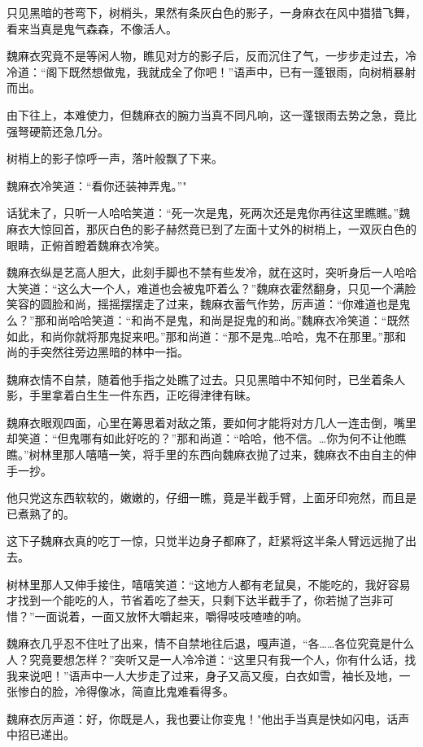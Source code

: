 \documentclass[12pt,oneside]{book}
\begin{document}
只见黑暗的苍弯下，树梢头，果然有条灰白色的影子，一身麻衣在风中猎猎飞舞，看来当真是鬼气森森，不像活人。

魏麻衣究竟不是等闲人物，瞧见对方的影子后，反而沉住了气，一步步走过去，冷冷道：``阁下既然想做鬼，我就成全了你吧！''语声中，已有一蓬银雨，向树梢暴射而出。

由下往上，本难使力，但魏麻衣的腕力当真不同凡响，这一蓬银雨去势之急，竟比强弩硬箭还急几分。

树梢上的影子惊呼一声，落叶般飘了下来。

魏麻衣冷笑道：``看你还装神弄鬼。''"

话犹未了，只听一人哈哈笑道：``死一次是鬼，死两次还是鬼你再往这里瞧瞧。''魏麻衣大惊回首，那灰白色的影子赫然竟已到了左面十丈外的树梢上，一双灰白色的眼睛，正俯首瞪着魏麻衣冷笑。

魏麻衣纵是艺高人胆大，此刻手脚也不禁有些发冷，就在这时，突听身后一人哈哈大笑道：``这么大一个人，难道也会被鬼吓着么？''魏麻衣霍然翻身，只见一个满脸笑容的圆脸和尚，摇摇摆摆走了过来，魏麻衣蓄气作势，厉声道：``你难道也是鬼么？''那和尚哈哈笑道：``和尚不是鬼，和尚是捉鬼的和尚。''魏麻衣冷笑道：``既然如此，和尚你就将那鬼捉来吧。''那和尚道：``那不是鬼\ldots 哈哈，鬼不在那里。''那和尚的手突然往旁边黑暗的林中一指。

魏麻衣情不自禁，随着他手指之处瞧了过去。只见黑暗中不知何时，已坐着条人影，手里拿着白生生一件东西，正吃得津律有昧。

魏麻衣眼观四面，心里在筹思着对敌之策，要如何才能将对方几人一连击倒，嘴里却笑道：``但鬼哪有如此好吃的？''那和尚道：``哈哈，他不信。\ldots 你为何不让他瞧瞧。''树林里那人嘻嘻一笑，将手里的东西向魏麻衣抛了过来，魏麻衣不由自主的伸手一抄。

他只党这东西软软的，嫩嫩的，仔细一瞧，竟是半截手臂，上面牙印宛然，而且是已煮熟了的。

这下子魏麻衣真的吃丁一惊，只觉半边身子都麻了，赶紧将这半条人臂远远抛了出去。

树林里那人又伸手接住，嘻嘻笑道：``这地方人都有老鼠臭，不能吃的，我好容易才找到一个能吃的人，节省着吃了叁天，只剩下达半截手了，你若抛了岂非可惜？''一面说着，一面又放怀大嚼起来，嚼得吱吱喳喳的响。

魏麻衣几乎忍不住吐了出来，情不自禁地往后退，嘎声道，``各\ldots\ldots 各位究竟是什么人？究竟要想怎样？''突听又是一人冷冷道：``这里只有我一个人，你有什么话，找我来说吧！''语声中一人大步走了过来，身子又高又瘦，白衣如雪，袖长及地，一张惨白的脸，冷得像冰，简直比鬼难看得多。

魏麻衣厉声道：好，你既是人，我也要让你变鬼！"他出手当真是快如闪电，话声中招已递出。
\end{document}
